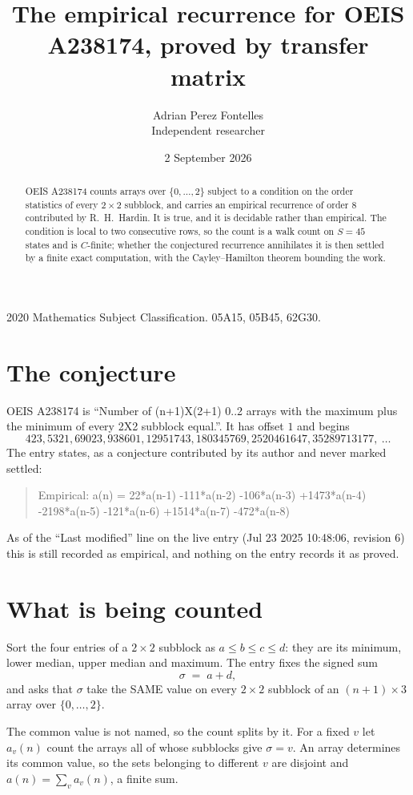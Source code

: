\documentclass[11pt,a4paper]{article}
\title{The empirical recurrence for OEIS A238174, proved by transfer matrix}
\author{Adrian Perez Fontelles\\ \small Independent researcher}
\date{2 September 2026}
\theoremstyle{plain}
\theoremstyle{definition}
\begin{document}
\maketitle

\begin{abstract}
OEIS A238174 counts arrays over $\{0,\dots,2\}$ subject to a condition on the order
statistics of every $2\times2$ subblock, and carries an empirical recurrence of order
$8$ contributed by R.~H.~Hardin. It is true, and it is decidable rather than empirical.
The condition is local to two consecutive rows, so the count is a walk count on $S=45$
states and is $C$-finite; whether the conjectured recurrence annihilates it is then settled by
a finite exact computation, with the Cayley--Hamilton theorem bounding the work.
\end{abstract}

\noindent\small 2020 Mathematics Subject Classification. 05A15, 05B45, 62G30.\normalsize

\section{The conjecture}

OEIS A238174 is ``Number of (n+1)X(2+1) 0..2 arrays with the maximum plus the minimum of every 2X2 subblock equal.''. It has offset $1$ and begins
\[
423, 5321, 69023, 938601, 12951743, 180345769, 2520461647, 35289713177,\ \dots
\]
The entry states, as a conjecture contributed by its author and never marked settled:
\begin{quote}
Empirical: a(n) = 22*a(n-1) -111*a(n-2) -106*a(n-3) +1473*a(n-4) -2198*a(n-5) -121*a(n-6) +1514*a(n-7) -472*a(n-8)
\end{quote}
As of the ``Last modified'' line on the live entry (Jul 23 2025 10:48:06, revision 6) this is still
recorded as empirical, and nothing on the entry records it as proved.

\section{What is being counted}

Sort the four entries of a $2\times2$ subblock as $a\le b\le c\le d$: they
are its minimum, lower median, upper median and maximum. The entry fixes the signed sum
\[
\sigma\;=\;a+d,
\]
and asks that $\sigma$ take the SAME value on every $2\times2$ subblock of an
$(n+1)\times3$ array over $\{0,\dots,2\}$.

The common value is not named, so the count splits by it. For a fixed $v$ let $a_v(n)$ count
the arrays all of whose subblocks give $\sigma=v$. An array determines its common value, so
the sets belonging to different $v$ are disjoint and $a(n)=\sum_v a_v(n)$, a finite sum.
\end{document}
